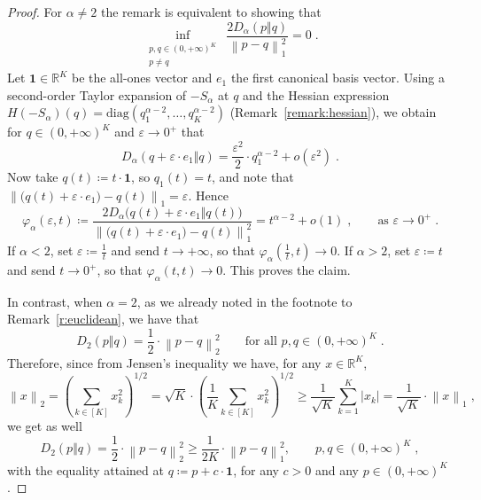 \documentclass[11pt,oneside,a4paper]{article}
\newcommand{\R}{\mathbb{R}}
\newcommand{\e}{\varepsilon}
\newcommand{\lrb}[1]{\left(#1\right)}
\newcommand{\brb}[1]{\bigl(#1\bigr)}
\newcommand{\lno}[1]{\left\lVert#1\right\rVert}
\theoremstyle{plain}
\theoremstyle{definition}
\theoremstyle{remark}
\begin{document}
{\renewcommand{\proofname}{Proof of Remark \ref{rem:nopinsker-orthant}}\begin{proof}
For $\alpha \neq 2$ the remark is equivalent to showing that
\[
    \inf_{\substack{p,q\in(0,+\infty)^K\\ p\neq q}}\ \frac{2D_\alpha(p\Vert q)}{\lno{p-q}_1^2}
=
    0\;.
\]
Let $\mathbf{1}\in\R^K$ be the all-ones vector and $e_1$ the first canonical basis vector.
Using a second-order Taylor expansion of $-S_\alpha$ at $q$ and the Hessian expression
$
    H(-S_\alpha)(q)
=
    \mathrm{diag}(q_1^{\alpha-2},\dots,q_K^{\alpha-2})
$
(Remark~\ref{remark:hessian}),
we obtain for $q\in(0,+\infty)^K$ and $\e\to 0^+$ that
\[
    D_\alpha(q+\e \cdot e_1 \Vert q)=\frac{\e^2}{2}\cdot q_1^{\alpha-2}+o(\e^2)\;.
\]
Now take $q(t)\coloneqq t\cdot\mathbf{1}$, so $q_1(t)=t$, and note that $\lno{ \brb{q(t)+\e \cdot e_1}-q(t)}_1=\e$.
Hence
\[
    \varphi_\alpha(\e,t)
\coloneqq
    \frac{2D_\alpha\brb{q(t)+\e \cdot e_1 \Vert q(t)}}{\lno{\brb{q(t)+\e \cdot e_1}-q(t)}_1^2}
=
    t^{\alpha-2}+o(1)\;,\qquad \textrm{as $\e \to 0^+$}\;.
\]
If $\alpha<2$, set $\e \coloneqq \frac{1}{t}$ and send $t\to+\infty$, so that $\varphi_\alpha\lrb{\frac{1}{t},t} \to 0$.
If $\alpha>2$, set $\e \coloneqq t$ and send $t\to0^+$, so that  $\varphi_\alpha\lrb{t,t} \to 0$.
This proves the claim.

\noindent
In contrast, when $\alpha=2$, as we already noted in the footnote to Remark~\ref{r:euclidean}, we have that
\[
    D_2(p\Vert q)
=
    \frac12 \cdot \lno{p-q}_2^2 \qquad \text{for all }p,q\in(0,+\infty)^K\;.
\]
Therefore, since from Jensen's inequality we have, for any $x \in \R^K$,
\[
    \lno{x}_2
=
    \lrb{\sum_{k \in [K]} x_k^2}^{1/2}
=
    \sqrt{K} \cdot\lrb{\frac{1}{K}\sum_{k \in [K]} x_k^2}^{1/2}
\ge
    \frac{1}{\sqrt{K}}\sum_{k=1}^K|x_k|
=
    \frac{1}{\sqrt{K}}\cdot \lno{x}_1\;,
\]
we get as well
\[
    D_2(p\Vert q)
=
    \frac12 \cdot \lno{p-q}_2^2
\ge
    \frac{1}{2K}\cdot \lno{p-q}_1^2,
\qquad
    p,q\in(0,+\infty)^K\;,
\]
with the equality attained at $q \coloneqq p + c\cdot \mathbf{1}$, for any $c >0$ and any $p \in (0,+\infty)^K$.
\end{proof}
}
\end{document}
